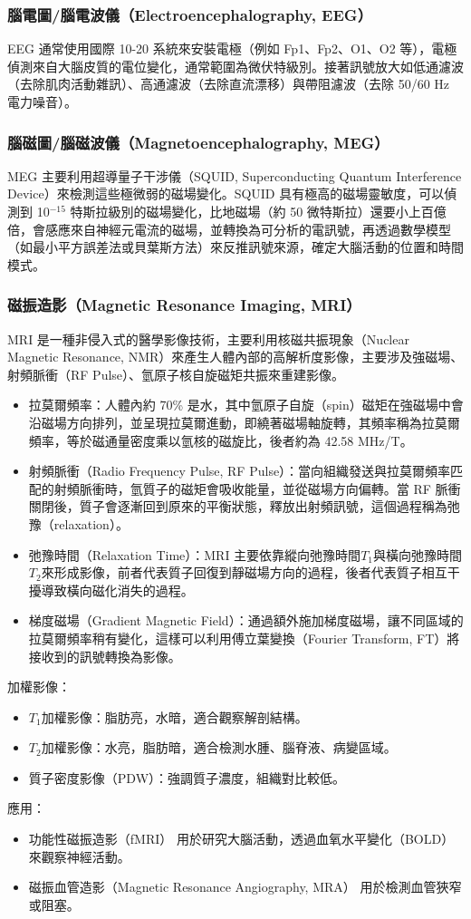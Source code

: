 \documentclass[a4paper,12pt]{report}
\begin{document}
\begin{itemize}
\subsubsection{腦電圖/腦電波儀（Electroencephalography, EEG）}
EEG 通常使用國際 10-20 系統來安裝電極（例如 Fp1、Fp2、O1、O2 等），電極偵測來自大腦皮質的電位變化，通常範圍為微伏特級別。接著訊號放大如低通濾波（去除肌肉活動雜訊）、高通濾波（去除直流漂移）與帶阻濾波（去除 50/60 Hz 電力噪音）。
\subsubsection{腦磁圖/腦磁波儀（Magnetoencephalography, MEG）}
MEG 主要利用超導量子干涉儀（SQUID, Superconducting Quantum Interference Device）來檢測這些極微弱的磁場變化。SQUID 具有極高的磁場靈敏度，可以偵測到 10$^{-15}$ 特斯拉級別的磁場變化，比地磁場（約 50 微特斯拉）還要小上百億倍，會感應來自神經元電流的磁場，並轉換為可分析的電訊號，再透過數學模型（如最小平方誤差法或貝葉斯方法）來反推訊號來源，確定大腦活動的位置和時間模式。
\subsubsection{磁振造影（Magnetic Resonance Imaging, MRI）}
MRI 是一種非侵入式的醫學影像技術，主要利用核磁共振現象（Nuclear Magnetic Resonance, NMR）來產生人體內部的高解析度影像，主要涉及強磁場、射頻脈衝（RF Pulse）、氫原子核自旋磁矩共振來重建影像。
\begin{itemize}
\item 拉莫爾頻率：人體內約 70\% 是水，其中氫原子自旋（spin）磁矩在強磁場中會沿磁場方向排列，並呈現拉莫爾進動，即繞著磁場軸旋轉，其頻率稱為拉莫爾頻率，等於磁通量密度乘以氫核的磁旋比，後者約為 42.58 MHz/T。
\item 射頻脈衝（Radio Frequency Pulse, RF Pulse）：當向組織發送與拉莫爾頻率匹配的射頻脈衝時，氫質子的磁矩會吸收能量，並從磁場方向偏轉。當 RF 脈衝關閉後，質子會逐漸回到原來的平衡狀態，釋放出射頻訊號，這個過程稱為弛豫（relaxation）。
\item 弛豫時間（Relaxation Time）：MRI 主要依靠縱向弛豫時間$T_1$與橫向弛豫時間$T_2$來形成影像，前者代表質子回復到靜磁場方向的過程，後者代表質子相互干擾導致橫向磁化消失的過程。
\item 梯度磁場（Gradient Magnetic Field）：通過額外施加梯度磁場，讓不同區域的拉莫爾頻率稍有變化，這樣可以利用傅立葉變換（Fourier Transform, FT）將接收到的訊號轉換為影像。
\end{itemize}
加權影像：
\begin{itemize}
\item $T_1$加權影像：脂肪亮，水暗，適合觀察解剖結構。
\item $T_2$加權影像：水亮，脂肪暗，適合檢測水腫、腦脊液、病變區域。
\item 質子密度影像（PDW）：強調質子濃度，組織對比較低。
\end{itemize}
應用：
\begin{itemize}
\item 功能性磁振造影（fMRI） 用於研究大腦活動，透過血氧水平變化（BOLD）來觀察神經活動。
\item 磁振血管造影（Magnetic Resonance Angiography, MRA） 用於檢測血管狹窄或阻塞。
\end{itemize}



\end{itemize}
\end{document}
